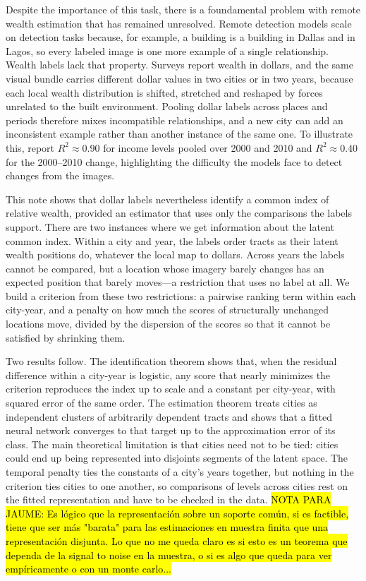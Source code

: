 \documentclass[11pt]{article}
\theoremstyle{remark}
\begin{document}
Despite the importance of this task, there is a foundamental problem with remote wealth estimation that has remained unresolved. Remote detection models scale on detection tasks because, for example, a building is a building in Dallas and in Lagos, so every labeled image is one more example of a single relationship. Wealth labels lack that property. Surveys report wealth in dollars, and the same visual bundle carries different dollar values in two cities or in two years, because each local wealth distribution is shifted, stretched and reshaped by forces unrelated to the built environment. Pooling dollar labels across places and periods therefore mixes incompatible relationships, and a new city can add an inconsistent
example rather than another instance of the same one. To illustrate this, \citet{khachiyan2022} report $R^{2}\approx 0.90$
for income levels pooled over 2000 and 2010 and $R^{2}\approx 0.40$ for the 2000--2010 change, highlighting the difficulty the models face to detect changes from the images.

This note shows that dollar labels nevertheless identify a common index of relative wealth, provided an estimator that uses only the comparisons the labels support. There are two instances where we get information about the latent common index. Within a city and year, the labels order tracts
as their latent wealth positions do, whatever the local map to dollars. Across years the labels cannot be compared, but a location whose imagery barely changes has an expected position that barely moves---a restriction that uses no label at all. We build a criterion from these two restrictions: a pairwise ranking term within each city-year, and a penalty on how much the scores of structurally unchanged locations move, divided by the dispersion of the scores so that it cannot be satisfied by shrinking them.

Two results follow. The identification theorem shows that, when the residual difference within a city-year is logistic, any score that nearly minimizes the
criterion reproduces the index up to scale and a constant per city-year, with squared error of the same order. The estimation theorem treats cities as independent clusters of arbitrarily dependent tracts and shows that a fitted neural network converges to that target up to the approximation error of its class. The main theoretical limitation is that cities need not to be tied: cities could end up being represented into disjoints segments of the latent space. The temporal penalty ties the constants of a city's years together, but nothing in the criterion ties cities to one another, so comparisons of levels across cities rest on the fitted representation and have to be checked in the data. \hl{NOTA PARA JAUME: Es lógico que la representación sobre un soporte común, si es factible, tiene que ser más "barata" para las estimaciones en muestra finita que una representación disjunta. Lo que no me queda claro es si esto es un teorema que dependa de la signal to noise en la muestra, o si es algo que queda para ver empíricamente o con un monte carlo...} 
\end{document}
